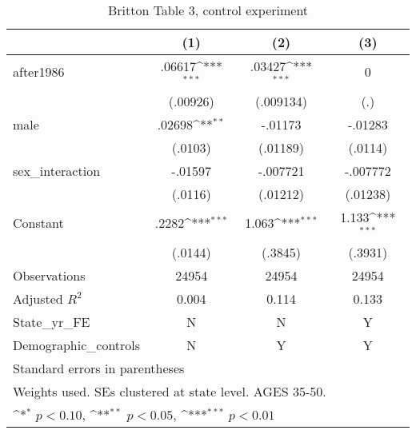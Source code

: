 \begin{table}[htbp]\centering
\def\sym#1{\ifmmode^{#1}\else\(^{#1}\)\fi}
\caption{Britton Table 3, control experiment}
\begin{tabular}{l*{3}{c}}
\hline\hline
                    &\multicolumn{1}{c}{(1)}         &\multicolumn{1}{c}{(2)}         &\multicolumn{1}{c}{(3)}         \\
\hline
after1986           &      .06617\sym{***}&      .03427\sym{***}&           0         \\
                    &    (.00926)         &   (.009134)         &         (.)         \\
[1em]
male                &      .02698\sym{**} &     -.01173         &     -.01283         \\
                    &     (.0103)         &    (.01189)         &     (.0114)         \\
[1em]
sex\_interaction     &     -.01597         &    -.007721         &    -.007772         \\
                    &     (.0116)         &    (.01212)         &    (.01238)         \\
[1em]
Constant            &       .2282\sym{***}&       1.063\sym{***}&       1.133\sym{***}\\
                    &     (.0144)         &     (.3845)         &     (.3931)         \\
\hline
Observations        &       24954         &       24954         &       24954         \\
Adjusted \(R^{2}\)  &       0.004         &       0.114         &       0.133         \\
State\_yr\_FE         &           N         &           N         &           Y         \\
Demographic\_controls&           N         &           Y         &           Y         \\
\hline\hline
\multicolumn{4}{l}{\footnotesize Standard errors in parentheses}\\
\multicolumn{4}{l}{\footnotesize Weights used. SEs clustered at state level. AGES 35-50.}\\
\multicolumn{4}{l}{\footnotesize \sym{*} \(p<0.10\), \sym{**} \(p<0.05\), \sym{***} \(p<0.01\)}\\
\end{tabular}
\end{table}
